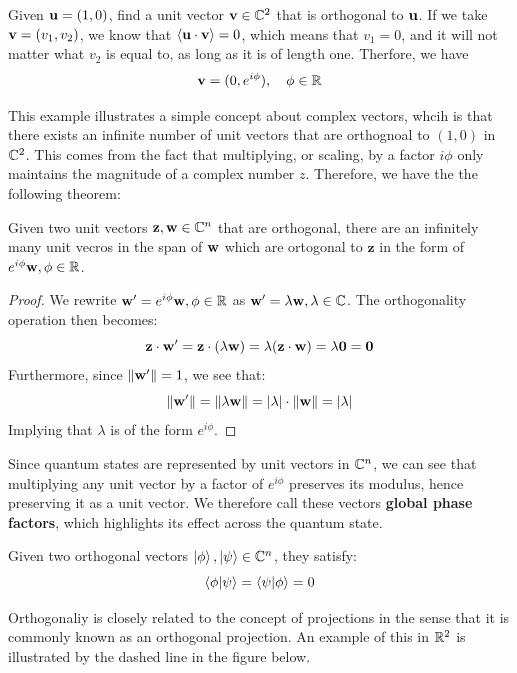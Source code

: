 \documentclass[12pt]{article}
\begin{document}
\begin{example}
    Given $\mathbf{u} = (1, 0)$, find a unit vector $\mathbf{v} \in \mathbb{C}^2$ that is orthogonal to $\mathbf{u}$. If we take $\mathbf{v} = (v_1, v_2)$, we know that $\left\langle\mathbf{u} \cdot \mathbf{v} \right\rangle = 0$, which means that $v_1 = 0$, and it will not matter what $v_2$ is equal to, as long as it is of length one. Therfore, we have
    $$\mathbf{v} = (0, e^{i \phi}), \quad \phi \in \mathbb{R}$$
\end{example}

This example illustrates a simple concept about complex vectors, whcih is that there exists an infinite number of unit vectors that are orthognoal to $(1, 0)$ in $\mathbb{C}^2$. This comes from the fact that multiplying, or scaling, by a factor $i \phi$ only maintains the magnitude of a complex number $z$. Therefore, we have the the following theorem:

\begin{theorem}
    Given two unit vectors $\mathbf{z}, \mathbf{w} \in \mathbb{C}^n$ that are orthogonal, there are an infinitely many unit vecros in the span of $\mathbf{w}$ which are ortogonal to $\mathbf{z}$ in the form of $e^{i \phi}\mathbf{w}, \phi \in \mathbb{R}$. 
\end{theorem}

\begin{proof}
    We rewrite $\mathbf{w}^\prime = e^{i \phi}\mathbf{w}, \phi \in \mathbb{R}$ as $\mathbf{w}^\prime = \lambda \mathbf{w}, \lambda \in \mathbb{C}$. The orthogonality operation then becomes:
    $$\mathbf{z} \cdot \mathbf{w}^\prime = \mathbf{z} \cdot (\lambda \mathbf{w}) = \lambda (\mathbf{z} \cdot \mathbf{w}) = \lambda \mathbf{0} = \mathbf{0}$$
    Furthermore, since $\norm{\mathbf{w}^\prime} = 1$, we see that:
    $$\norm{\mathbf{w}^\prime} = \norm{\lambda \mathbf{w}} = \abs{\lambda} \cdot \norm{\mathbf{w}} = \abs{\lambda}$$
    Implying that $\lambda$ is of the form $e^{i \phi}$.
\end{proof}

Since quantum states are represented by unit vectors in $\mathbb{C}^n$, we can see that multiplying any unit vector by a factor of $e^{i \phi}$ preserves its modulus, hence preserving it as a unit vector. We therefore call these vectors \textbf{global phase factors}, which highlights its effect across the quantum state. 

\begin{theorem}
    Given two orthogonal vectors $\ket{\phi}, \ket{\psi} \in \mathbb{C}^n$, they satisfy:
    $$\braket{\phi}{\psi} = \braket{\psi}{\phi} = 0$$
\end{theorem}

Orthogonaliy is closely related to the concept of projections in the sense that it is commonly known as an orthogonal projection. An example of this in $\mathbb{R}^2$ is illustrated by the dashed line in the figure below. 
\end{document}
